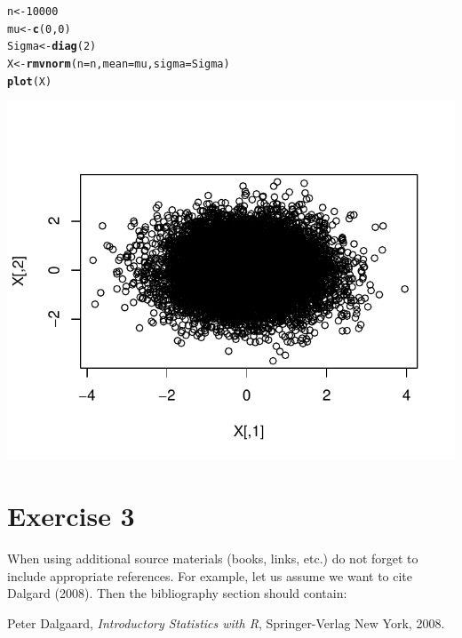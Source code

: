 \documentclass[12pt, a4paper]{article}\usepackage[]{graphicx}\usepackage[]{color}
\makeatletter
\def\maxwidth{ %
  \ifdim\Gin@nat@width>\linewidth
    \linewidth
  \else
    \Gin@nat@width
  \fi
}
\newcommand{\hlnum}[1]{\textcolor[rgb]{0.686,0.059,0.569}{#1}}%
\newcommand{\hlstd}[1]{\textcolor[rgb]{0.345,0.345,0.345}{#1}}%
\newcommand{\hlkwb}[1]{\textcolor[rgb]{0.69,0.353,0.396}{#1}}%
\newcommand{\hlkwc}[1]{\textcolor[rgb]{0.333,0.667,0.333}{#1}}%
\newcommand{\hlkwd}[1]{\textcolor[rgb]{0.737,0.353,0.396}{\textbf{#1}}}%
\newenvironment{kframe}{%
 \def\at@end@of@kframe{}%
 \ifinner\ifhmode%
  \def\at@end@of@kframe{\end{minipage}}%
  \begin{minipage}{\columnwidth}%
 \fi\fi%
 \def\FrameCommand##1{\hskip\@totalleftmargin \hskip-\fboxsep
 \colorbox{shadecolor}{##1}\hskip-\fboxsep
     \hskip-\linewidth \hskip-\@totalleftmargin \hskip\columnwidth}%
 \MakeFramed {\advance\hsize-\width
   \@totalleftmargin\z@ \linewidth\hsize
   \@setminipage}}%
 {\par\unskip\endMakeFramed%
 \at@end@of@kframe}
\newenvironment{knitrout}{}{} %
\makeatother
\begin{document}
\begin{knitrout}
\color{fgcolor}\begin{kframe}
\begin{alltt}
\hlstd{n} \hlkwb{<-} \hlnum{10000}
\hlstd{mu} \hlkwb{<-} \hlkwd{c}\hlstd{(}\hlnum{0}\hlstd{,} \hlnum{0}\hlstd{)}
\hlstd{Sigma} \hlkwb{<-} \hlkwd{diag}\hlstd{(}\hlnum{2}\hlstd{)}
\hlstd{X} \hlkwb{<-} \hlkwd{rmvnorm}\hlstd{(}\hlkwc{n} \hlstd{= n,} \hlkwc{mean} \hlstd{= mu,} \hlkwc{sigma} \hlstd{=  Sigma)}
\hlkwd{plot}\hlstd{(X)}
\end{alltt}
\end{kframe}

{\centering \includegraphics[width=\maxwidth]{figure/ex2histZ-1} 

}



\end{knitrout}












\section{Exercise 3}













When using additional source materials (books, links, etc.)
do not forget to include appropriate references.  For example, let us assume 
we want to cite Dalgard (2008). Then the bibliography section should contain:

\begin{thebibliography}{}
 
  Peter Dalgaard, \emph{Introductory Statistics with R}, Springer-Verlag New York, 2008.

\end{thebibliography}
\end{document}
